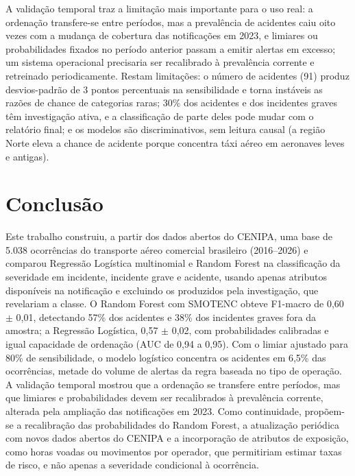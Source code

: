 \documentclass[12pt]{article}
\begin{document}
A validação temporal traz a limitação mais importante para o uso real: a ordenação transfere-se entre períodos, mas a prevalência de acidentes caiu oito vezes com a mudança de cobertura das notificações em 2023, e limiares ou probabilidades fixados no período anterior passam a emitir alertas em excesso; um sistema operacional precisaria ser recalibrado à prevalência corrente e retreinado periodicamente. Restam limitações: o número de acidentes (91) produz desvios-padrão de 3 pontos percentuais na sensibilidade e torna instáveis as razões de chance de categorias raras; 30\% dos acidentes e dos incidentes graves têm investigação ativa, e a classificação de parte deles pode mudar com o relatório final; e os modelos são discriminativos, sem leitura causal (a região Norte eleva a chance de acidente porque concentra táxi aéreo em aeronaves leves e antigas).

\FloatBarrier
\section{Conclusão}
\label{sec:conclusao}

Este trabalho construiu, a partir dos dados abertos do CENIPA, uma base de 5.038 ocorrências do transporte aéreo comercial brasileiro (2016--2026) e comparou Regressão Logística multinomial e Random Forest na classificação da severidade em incidente, incidente grave e acidente, usando apenas atributos disponíveis na notificação e excluindo os produzidos pela investigação, que revelariam a classe. O Random Forest com SMOTENC obteve F1-macro de 0,60 $\pm$ 0,01, detectando 57\% dos acidentes e 38\% dos incidentes graves fora da amostra; a Regressão Logística, 0,57 $\pm$ 0,02, com probabilidades calibradas e igual capacidade de ordenação (AUC de 0,94 a 0,95). Com o limiar ajustado para 80\% de sensibilidade, o modelo logístico concentra os acidentes em 6,5\% das ocorrências, metade do volume de alertas da regra baseada no tipo de operação. A validação temporal mostrou que a ordenação se transfere entre períodos, mas que limiares e probabilidades devem ser recalibrados à prevalência corrente, alterada pela ampliação das notificações em 2023. Como continuidade, propõem-se a recalibração das probabilidades do Random Forest, a atualização periódica com novos dados abertos do CENIPA e a incorporação de atributos de exposição, como horas voadas ou movimentos por operador, que permitiriam estimar taxas de risco, e não apenas a severidade condicional à ocorrência.



\end{document}
